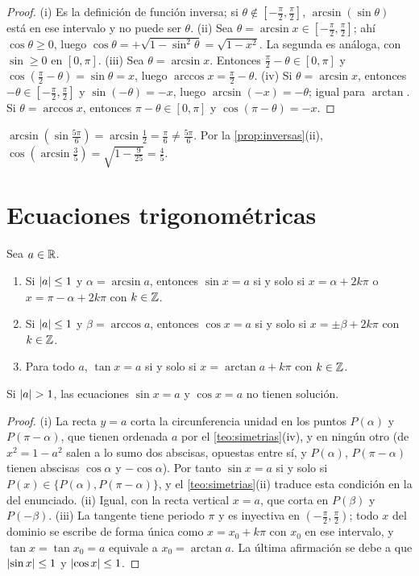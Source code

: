 \begin{proof}
(i) Es la definición de función inversa; si $\theta\notin[-\frac{\pi}{2},\frac{\pi}{2}]$, $\arcsin(\sin\theta)$ está en ese intervalo y no puede ser $\theta$. (ii) Sea $\theta=\arcsin x\in[-\frac{\pi}{2},\frac{\pi}{2}]$; ahí $\cos\theta\ge0$, luego $\cos\theta=+\sqrt{1-\sin^{2}\theta}=\sqrt{1-x^{2}}$. La segunda es análoga, con $\sin\ge0$ en $[0,\pi]$. (iii) Sea $\theta=\arcsin x$. Entonces $\frac{\pi}{2}-\theta\in[0,\pi]$ y $\cos(\frac{\pi}{2}-\theta)=\sin\theta=x$, luego $\arccos x=\frac{\pi}{2}-\theta$. (iv) Si $\theta=\arcsin x$, entonces $-\theta\in[-\frac{\pi}{2},\frac{\pi}{2}]$ y $\sin(-\theta)=-x$, luego $\arcsin(-x)=-\theta$; igual para $\arctan$. Si $\theta=\arccos x$, entonces $\pi-\theta\in[0,\pi]$ y $\cos(\pi-\theta)=-x$.
\end{proof}

\begin{ejemplo}\label{ej:inversas}
$\arcsin(\sin\frac{5\pi}{6})=\arcsin\frac12=\frac{\pi}{6}\ne\frac{5\pi}{6}$. Por la \cref{prop:inversas}(ii), $\cos(\arcsin\frac35)=\sqrt{1-\frac{9}{25}}=\frac45$.
\end{ejemplo}

\section{Ecuaciones trigonométricas}

\begin{teorema}\label{teo:ecuaciones}
Sea $a\in\mathbb{R}$.
\begin{enumerate}
  \item Si $\lvert a\rvert\le1$ y $\alpha=\arcsin a$, entonces $\sin x=a$ si y solo si $x=\alpha+2k\pi$ o $x=\pi-\alpha+2k\pi$ con $k\in\mathbb{Z}$.
  \item Si $\lvert a\rvert\le1$ y $\beta=\arccos a$, entonces $\cos x=a$ si y solo si $x=\pm\beta+2k\pi$ con $k\in\mathbb{Z}$.
  \item Para todo $a$, $\tan x=a$ si y solo si $x=\arctan a+k\pi$ con $k\in\mathbb{Z}$.
\end{enumerate}
Si $\lvert a\rvert>1$, las ecuaciones $\sin x=a$ y $\cos x=a$ no tienen solución.
\end{teorema}

\begin{proof}
(i) La recta $y=a$ corta la circunferencia unidad en los puntos $P(\alpha)$ y $P(\pi-\alpha)$, que tienen ordenada $a$ por el \cref{teo:simetrias}(iv), y en ningún otro (de $x^{2}=1-a^{2}$ salen a lo sumo dos abscisas, opuestas entre sí, y $P(\alpha)$, $P(\pi-\alpha)$ tienen abscisas $\cos\alpha$ y $-\cos\alpha$). Por tanto $\sin x=a$ si y solo si $P(x)\in\{P(\alpha),P(\pi-\alpha)\}$, y el \cref{teo:simetrias}(ii) traduce esta condición en la del enunciado. (ii) Igual, con la recta vertical $x=a$, que corta en $P(\beta)$ y $P(-\beta)$. (iii) La tangente tiene periodo $\pi$ y es inyectiva en $(-\frac{\pi}{2},\frac{\pi}{2})$; todo $x$ del dominio se escribe de forma única como $x=x_0+k\pi$ con $x_0$ en ese intervalo, y $\tan x=\tan x_0=a$ equivale a $x_0=\arctan a$. La última afirmación se debe a que $\lvert\sin x\rvert\le1$ y $\lvert\cos x\rvert\le1$.
\end{proof}

